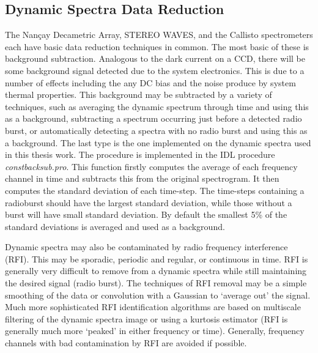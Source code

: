 \subsection{Dynamic Spectra Data Reduction}

The Nan\c{c}ay Decametric Array, STEREO WAVES, and the Callisto spectrometers each have basic data reduction techniques in common. The most basic of these is background subtraction. Analogous to the dark current on a CCD, there will be some background signal detected due to the system electronics. This is due to a number of effects including the any DC bias and the noise produce by system thermal properties. This background may be subtracted by a variety of techniques, such as averaging the dynamic spectrum through time and using this as a background, subtracting a spectrum occurring just before a detected radio burst, or automatically detecting a spectra with no radio burst and using this as a background. The last type is the one implemented on the dynamic spectra used in this thesis work. The procedure is implemented in the IDL procedure {\it constbacksub.pro}. This function firstly computes the average of each frequency channel in time and subtracts this from the original spectrogram. It then computes the standard deviation of each time-step. The time-steps containing a radioburst should have the largest standard deviation, while those without a burst will have small standard deviation. By default the smallest  5\% of the standard deviations is averaged and used as a background.

Dynamic spectra may also be contaminated by radio frequency interference (RFI). This may be sporadic, periodic and regular, or continuous in time. RFI is generally very difficult to remove from a dynamic spectra while still maintaining the desired signal (radio burst). The techniques of RFI removal may be a simple smoothing of the data  or convolution with a Gaussian to `average out' the signal. Much more sophisticated RFI identification algorithms are based on multiscale filtering of the dynamic spectra image or using a kurtosis estimator \citep{nita2007, nita2010}(RFI is generally much more `peaked' in either frequency or time). Generally, frequency channels with bad contamination by RFI are avoided if possible.
